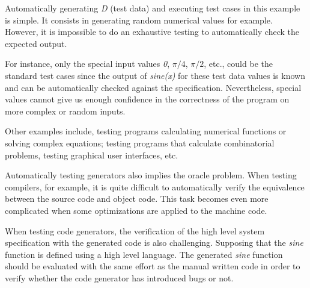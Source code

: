 Automatically generating  \textit{D} (test data) and executing test cases in this example is simple. It consists in generating random numerical values for example. However, it is impossible to do an exhaustive testing to automatically check the expected output.

For instance, only the special input values  \textit{0}, $\pi/4$,  $\pi/2$, etc., could be the standard test cases since the output of  \textit{sine(x)} for these test data values is known and can be automatically checked against the specification. Nevertheless, special values cannot give us enough confidence in the correctness of the program on more complex or random inputs. 

Other examples include, testing programs calculating numerical functions or solving complex equations; testing programs that calculate combinatorial problems, testing graphical user interfaces, etc.

Automatically testing generators also implies the oracle problem. When testing compilers, for example, it is quite difficult to automatically verify the equivalence between the source code and object code. This task becomes even more complicated when some optimizations are applied to the machine code. 

When testing code generators, the verification of the high level system specification with the generated code is also challenging. Supposing that the \textit{sine} function is defined using a high level language. The generated \textit{sine} function should be evaluated with the same effort as the manual written code in order to verify whether the code generator has introduced bugs or not. 




